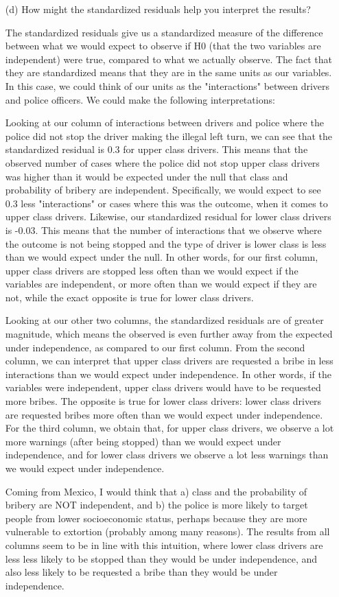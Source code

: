\documentclass[12pt,letterpaper]{article}
\begin{document}
\begin{enumerate}
	\item [(d)] How might the standardized residuals help you interpret the results?  
	\vspace{.5cm}
	
	The standardized residuals give us a standardized measure of the difference between what we would expect to observe if H0 (that the two variables are independent) were true, 
	compared to what we actually observe. The fact that they are standardized means that they are in the same units as our variables. In this case, we could think of our units as the
	"interactions" between drivers and police officers. We could make the following interpretations: 
	
	Looking at our column of interactions between drivers and police where the police did not stop the driver making the illegal left turn, we can see that the standardized residual is 0.3 for upper class drivers. This means that the observed number of cases where the police did not stop upper class drivers was higher than it would be expected under the null that class and probability of bribery are independent. Specifically, we would expect to see 0.3 less "interactions" or cases where this was the outcome, when it comes to upper class drivers. Likewise, our standardized residual for lower class drivers is -0.03. This means that the number of interactions that we observe where the outcome is not being stopped and the type of driver is lower class is less than we would expect under the null. In other words, for our first column, upper class drivers are stopped less often than we would expect if the variables are independent, or more often than we would expect if they are not, while the exact opposite is true for lower class drivers. 
		
	Looking at our other two columns, the standardized residuals are of greater magnitude, which means the observed is even further away from the expected under independence, as compared to our first column. From the second column, we can interpret that upper class drivers are requested a bribe in less interactions than we would expect under independence. In other words, if the variables were independent, upper class drivers would have to be requested more bribes. The opposite is true for lower class drivers: lower class drivers are requested bribes more often than we would expect under independence. For the third column, we obtain that, for upper class drivers, we observe a lot more warnings (after being stopped) than we would expect under independence, and for lower class drivers we observe a lot less warnings than we would expect under independence. 
	
	Coming from Mexico, I would think that a) class and the probability of bribery are NOT independent, and b) the police is more likely to target people from lower socioeconomic status, perhaps because they are more vulnerable to extortion (probably among many reasons). The results from all columns seem to be in line with this intuition, where lower class drivers are less less likely to be stopped than they would be under independence, and also less likely to be requested a bribe than they would be under independence. 
	
\end{enumerate}
\end{document}
